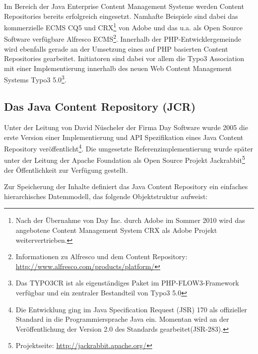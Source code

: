 Im Bereich der Java Enterprise Content Management Systeme werden Content Repositories bereits erfolgreich eingesetzt. Namhafte Beispiele sind dabei das kommerzielle ECMS CQ5 und CRX\footnote{Nach der Übernahme von Day Inc. durch Adobe im Sommer 2010 wird das angebotene Content Management System CRX als Adobe Projekt weitervertrieben.} von Adobe und das u.a. als Open Source Software verfügbare Alfresco ECMS\footnote{Informationen zu Alfresco und dem Content Repository: \href{http://www.alfresco.com/products/platform/}{http://www.alfresco.com/products/platform/}}.
Innerhalb der PHP-Entwicklergemeinde wird ebenfalls gerade an der Umsetzung eines auf PHP basierten Content Repositories gearbeitet. Initiatoren sind dabei vor allem die Typo3 Association mit einer Implementierung innerhalb des neuen Web Content Management Systems Typo3 5.0\footnote{Das TYPO3CR ist als eigenständiges Paket im PHP-FLOW3-Framework verfügbar und ein zentraler Bestandteil von Typo3 5.0}.


\subsection{Das Java Content Repository (JCR)}

Unter der Leitung von David Nüscheler der Firma Day Software wurde 2005 die erste Version einer Implementierung und API Spezifikation eines Java Content Repository veröffentlicht\footnote{Die Entwicklung ging im Java Specification Request (JSR) 170 als offizieller Standard in die Programmiersprache Java ein. Momentan wird an der Veröffentlichung der Version 2.0 des Standards gearbeitet(JSR-283).}. Die umgesetzte Referenzimplementierung wurde später unter der Leitung der Apache Foundation als Open Source Projekt Jackrabbit\footnote{Projektseite: \href{http://jackrabbit.apache.org/}{http://jackrabbit.apache.org/}} der Öffentlichkeit zur Verfügung gestellt.

Zur Speicherung der Inhalte definiert das Java Content Repository ein einfaches hierarchisches Datemmodell, das folgende Objektstruktur aufweist:



